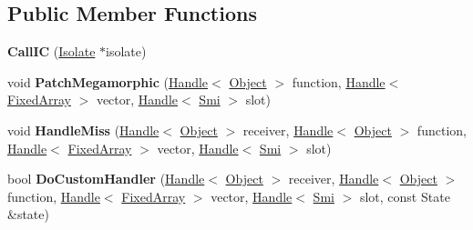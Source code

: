\subsection*{Public Member Functions}
\begin{DoxyCompactItemize}
\item 
\hypertarget{classv8_1_1internal_1_1_call_i_c_ad6d7d05e19218aa378057855930e7385}{}{\bfseries Call\+I\+C} (\hyperlink{classv8_1_1internal_1_1_isolate}{Isolate} $\ast$isolate)\label{classv8_1_1internal_1_1_call_i_c_ad6d7d05e19218aa378057855930e7385}

\item 
\hypertarget{classv8_1_1internal_1_1_call_i_c_ab8106613d486f5750ea5971e9f7618aa}{}void {\bfseries Patch\+Megamorphic} (\hyperlink{classv8_1_1internal_1_1_handle}{Handle}$<$ \hyperlink{classv8_1_1internal_1_1_object}{Object} $>$ function, \hyperlink{classv8_1_1internal_1_1_handle}{Handle}$<$ \hyperlink{classv8_1_1internal_1_1_fixed_array}{Fixed\+Array} $>$ vector, \hyperlink{classv8_1_1internal_1_1_handle}{Handle}$<$ \hyperlink{classv8_1_1internal_1_1_smi}{Smi} $>$ slot)\label{classv8_1_1internal_1_1_call_i_c_ab8106613d486f5750ea5971e9f7618aa}

\item 
\hypertarget{classv8_1_1internal_1_1_call_i_c_a4c217561e5491073af2e13041adb4848}{}void {\bfseries Handle\+Miss} (\hyperlink{classv8_1_1internal_1_1_handle}{Handle}$<$ \hyperlink{classv8_1_1internal_1_1_object}{Object} $>$ receiver, \hyperlink{classv8_1_1internal_1_1_handle}{Handle}$<$ \hyperlink{classv8_1_1internal_1_1_object}{Object} $>$ function, \hyperlink{classv8_1_1internal_1_1_handle}{Handle}$<$ \hyperlink{classv8_1_1internal_1_1_fixed_array}{Fixed\+Array} $>$ vector, \hyperlink{classv8_1_1internal_1_1_handle}{Handle}$<$ \hyperlink{classv8_1_1internal_1_1_smi}{Smi} $>$ slot)\label{classv8_1_1internal_1_1_call_i_c_a4c217561e5491073af2e13041adb4848}

\item 
\hypertarget{classv8_1_1internal_1_1_call_i_c_a6fc1985a0776d9885480632b6766093b}{}bool {\bfseries Do\+Custom\+Handler} (\hyperlink{classv8_1_1internal_1_1_handle}{Handle}$<$ \hyperlink{classv8_1_1internal_1_1_object}{Object} $>$ receiver, \hyperlink{classv8_1_1internal_1_1_handle}{Handle}$<$ \hyperlink{classv8_1_1internal_1_1_object}{Object} $>$ function, \hyperlink{classv8_1_1internal_1_1_handle}{Handle}$<$ \hyperlink{classv8_1_1internal_1_1_fixed_array}{Fixed\+Array} $>$ vector, \hyperlink{classv8_1_1internal_1_1_handle}{Handle}$<$ \hyperlink{classv8_1_1internal_1_1_smi}{Smi} $>$ slot, const State \&state)\label{classv8_1_1internal_1_1_call_i_c_a6fc1985a0776d9885480632b6766093b}

\end{DoxyCompactItemize}
